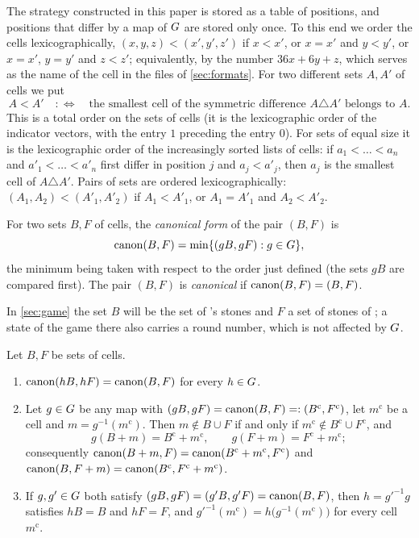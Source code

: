 The strategy constructed in this paper is stored as a table of positions, and positions that differ by a
map of $G$ are stored only once. To this end we order the cells lexicographically, $(x,y,z)<(x',y',z')$
if $x<x'$, or $x=x'$ and $y<y'$, or $x=x'$, $y=y'$ and $z<z'$; equivalently, by the number $36x+6y+z$,
which serves as the name of the cell in the files of \cref{sec:formats}. For two different sets $A,A'$ of
cells we put
\[
  A<A' \quad:\Longleftrightarrow\quad \text{the smallest cell of the symmetric difference }A\triangle A'
  \text{ belongs to }A .
\]
This is a total order on the sets of cells (it is the lexicographic order of the indicator vectors, with
the entry $1$ preceding the entry $0$). For sets of equal size it is the lexicographic order of the
increasingly sorted lists of cells: if $a_1<\dots<a_n$ and $a'_1<\dots<a'_n$ first differ in position $j$
and $a_j<a'_j$, then $a_j$ is the smallest cell of $A\triangle A'$. Pairs of sets are ordered
lexicographically: $(A_1,A_2)<(A'_1,A'_2)$ if $A_1<A'_1$, or $A_1=A'_1$ and $A_2<A'_2$.

\begin{definition}\label{def:canon}
For two sets $B,F$ of cells, the \emph{canonical form} of the pair $(B,F)$ is
\[
  \operatorname{canon}(B,F)=\min\{(gB,gF) : g\in G\},
\]
the minimum being taken with respect to the order just defined (the sets $gB$ are compared first). The
pair $(B,F)$ is \emph{canonical} if $\operatorname{canon}(B,F)=(B,F)$.
\end{definition}

In \cref{sec:game} the set $B$ will be the set of \Breaker's stones and $F$ a set of stones of \Maker; a
state of the game there also carries a round number, which is not affected by $G$.

\begin{lemma}\label{lem:canon}
Let $B,F$ be sets of cells.
\begin{enumerate}[label=\textup{(\alph*)}]
\item $\operatorname{canon}(hB,hF)=\operatorname{canon}(B,F)$ for every $h\in G$.
\item Let $g\in G$ be any map with $(gB,gF)=\operatorname{canon}(B,F)=:(B^{\mathrm c},F^{\mathrm c})$, let
      $m^{\mathrm c}$ be a cell and $m=g^{-1}(m^{\mathrm c})$. Then $m\notin B\cup F$ if and only if
      $m^{\mathrm c}\notin B^{\mathrm c}\cup F^{\mathrm c}$, and
      \[
        g(B+m)=B^{\mathrm c}+m^{\mathrm c},\qquad g(F+m)=F^{\mathrm c}+m^{\mathrm c};
      \]
      consequently $\operatorname{canon}(B+m,F)=\operatorname{canon}(B^{\mathrm c}+m^{\mathrm c},F^{\mathrm c})$ and
      $\operatorname{canon}(B,F+m)=\operatorname{canon}(B^{\mathrm c},F^{\mathrm c}+m^{\mathrm c})$.
\item If $g,g'\in G$ both satisfy $(gB,gF)=(g'B,g'F)=\operatorname{canon}(B,F)$, then $h=g'^{-1}g$ satisfies $hB=B$
      and $hF=F$, and $g'^{-1}(m^{\mathrm c})=h\bigl(g^{-1}(m^{\mathrm c})\bigr)$ for every cell
      $m^{\mathrm c}$.
\end{enumerate}
\end{lemma}

